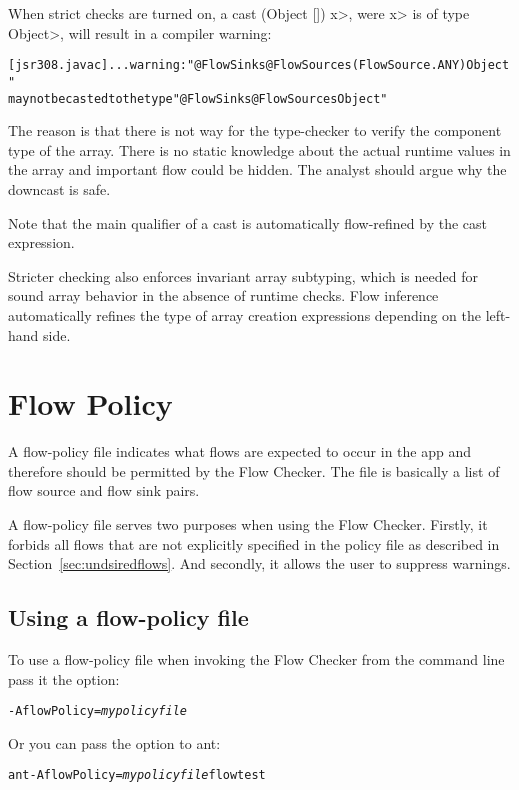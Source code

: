 When strict checks are turned on,
a cast \<(Object []) x>, were \<x> is of type \<Object>, will result
in a compiler warning:

\begin{alltt}
[jsr308.javac] ... warning: "@FlowSinks @FlowSources({FlowSource.ANY}) Object"
       may not be casted to the type "@FlowSinks @FlowSources Object"
\end{alltt}

The reason is that there is not way for the type-checker to verify
 the component type of the array. There is no static knowledge about the actual
runtime values in the array and important flow could be hidden.
The analyst should argue why the downcast is safe.

Note that the main qualifier of a cast is automatically flow-refined
by the cast expression.


\medskip

Stricter checking also enforces invariant array subtyping, which is
needed for sound array behavior in the absence of runtime checks.
Flow inference automatically refines the type of array creation
expressions depending on the left-hand side.

\section{Flow Policy}
\label{sec:flowpolicy}

A flow-policy file indicates what flows are expected to occur in the app
 and therefore should be permitted by the Flow Checker.  The file is basically a list 
 of flow source and flow sink pairs.

A flow-policy file serves two purposes when using the Flow Checker.
Firstly, it forbids all flows that are not explicitly specified in the policy file as described
in Section~\ref{sec:undsiredflows}.  And secondly, it allows the user to  
suppress warnings.

\subsection{Using a flow-policy file}
To use a flow-policy file when invoking the Flow Checker from the
command line pass it the option:
\begin{alltt}
-AflowPolicy=\emph{mypolicyfile}
\end{alltt}

Or you can pass the option to ant:
\begin{alltt}
ant -AflowPolicy=\emph{mypolicyfile} flowtest
\end{alltt}


